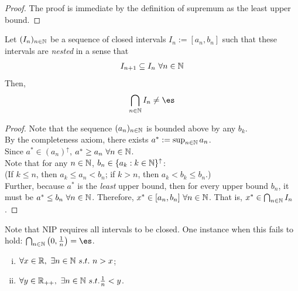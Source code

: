 \documentclass[11pt]{article}
\begin{document}
	\begin{proof}
		The proof is immediate by the definition of supremum as the least upper bound.
	\end{proof}
	
	\begin{theorem}
		Let $(I_n)_{n \in \mathbb{N}}$ be a sequence of closed intervals $I_n := [a_n, b_n]$ such that these intervals are \emph{nested} in a sense that
		\begin{align}
			I_{n+1} \subseteq I_n\ \forall n \in \mathbb{N}
		\end{align}
		Then,
		\begin{align}
			\bigcap_{n \in \N} I_n \neq \es
		\end{align}
	\end{theorem}
	
	\begin{proof}
		Note that the sequence $(a_n)_{n \in \mathbb{N}}$ is bounded above by any $b_k$.\\
		By the completeness axiom, there exists $a^* := \sup_{n \in \mathbb{N}} a_n$.\\
		Since $a^* \in (a_n)^\uparrow$, $a^* \geq a_n\ \forall n \in \mathbb{N}$.\\
		Note that for any $n \in \mathbb{N}$, $b_n \in \{a_k: k \in \mathbb{N}\}^\uparrow$: \\
		(If $k \leq n$, then $a_k \leq a_n < b_n$; if $k > n$, then $a_k < b_k \leq b_n$.) \\
		Further, because $a^*$ is the \emph{least} upper bound, then for every upper bound $b_n$, it must be $a^* \leq b_n\ \forall n \in \mathbb{N}$. Therefore, $x^* \in [a_n, b_n]\ \forall n \in \N$. That is, $x^* \in \bigcap_{n \in \mathbb{N}} I_n$.
	\end{proof}
	
	\begin{remark}
	Note that NIP requires all intervals to be closed. One instance when this fails to hold: $\bigcap_{n \in \N} \left(0, \frac{1}{n} \right) = \es$.
	\end{remark}
	
	\begin{theorem} \quad
		\begin{enumerate}[(i)]
			\item $\forall x \in \R,\ \exists n \in \N\ s.t.\ n > x$;
			\item $\forall y \in \mathbb{R}_{++},\ \exists n \in \mathbb{N}\ s.t. \frac{1}{n} < y$.
		\end{enumerate}
	\end{theorem}
	
\end{document}
